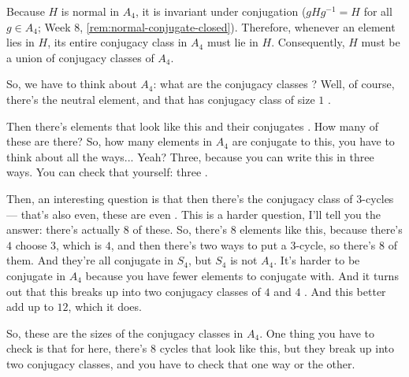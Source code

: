 \begin{proofWrapper}
\begin{content}
Because $H$ is normal in $A_4$, it is invariant under conjugation ($g H g^{-1} = H$ for all $g \in A_4$; Week 8, \cref{rem:normal-conjugate-closed}). Therefore, whenever an element lies in $H$, its entire conjugacy class in $A_4$ must lie in $H$. Consequently, $H$ must be a union of conjugacy classes of $A_4$.
\end{content}

\begin{hidden}
\end{hidden}

\begin{speech}[00:18:45 - 00:20:42]
So, we have to think about $A_4$: what are the conjugacy classes ? Well, of course, there's the neutral element, and that has conjugacy class of size $1$ .

Then there's elements that look like this and their conjugates . How many of these are there? So, how many elements in $A_4$ are conjugate to this, you have to think about all the ways... Yeah?  Three, because you can write this in three ways. You can check that yourself: three .

Then, an interesting question is that then there's the conjugacy class of $3$-cycles --- that's also even, these are even . This is a harder question, I'll tell you the answer: there's actually $8$ of these. So, there's $8$ elements like this, because there's $4$ choose $3$, which is $4$, and then there's two ways to put a $3$-cycle, so there's $8$ of them. And they're all conjugate in $S_4$, but $S_4$ is not $A_4$. It's harder to be conjugate in $A_4$ because you have fewer elements to conjugate with. And it turns out that this breaks up into two conjugacy classes of $4$ and $4$ . And this better add up to $12$, which it does.

So, these are the sizes of the conjugacy classes in $A_4$. One thing you have to check is that for here, there's $8$ cycles that look like this, but they break up into two conjugacy classes, and you have to check that one way or the other.


\end{speech}
\end{proofWrapper}
